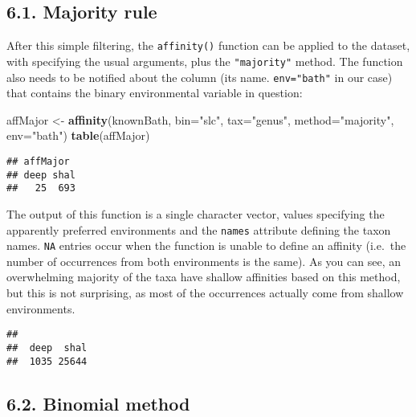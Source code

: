 \documentclass[]{article}
\newenvironment{Shaded}{\begin{snugshade}}{\end{snugshade}}
\newcommand{\KeywordTok}[1]{\textcolor[rgb]{0.13,0.29,0.53}{\textbf{{#1}}}}
\newcommand{\DataTypeTok}[1]{\textcolor[rgb]{0.13,0.29,0.53}{{#1}}}
\newcommand{\StringTok}[1]{\textcolor[rgb]{0.31,0.60,0.02}{{#1}}}
\newcommand{\NormalTok}[1]{{#1}}
\begin{document}
\subsection{6.1. Majority rule}\label{majority-rule}

After this simple filtering, the \texttt{affinity()} function can be
applied to the dataset, with specifying the usual arguments, plus the
\texttt{"majority"} method. The function also needs to be notified about
the column (its name. \texttt{env="bath"} in our case) that contains the
binary environmental variable in question:

\begin{Shaded}
\begin{Highlighting}[]
\NormalTok{affMajor <-}\StringTok{ }\KeywordTok{affinity}\NormalTok{(knownBath, }\DataTypeTok{bin=}\StringTok{"slc"}\NormalTok{, }\DataTypeTok{tax=}\StringTok{"genus"}\NormalTok{, }
  \DataTypeTok{method=}\StringTok{"majority"}\NormalTok{, }\DataTypeTok{env=}\StringTok{"bath"}\NormalTok{)}
\KeywordTok{table}\NormalTok{(affMajor)}
\end{Highlighting}
\end{Shaded}

\begin{verbatim}
## affMajor
## deep shal 
##   25  693
\end{verbatim}

The output of this function is a single character vector, values
specifying the apparently preferred environments and the \texttt{names}
attribute defining the taxon names. \texttt{NA} entries occur when the
function is unable to define an affinity (i.e.~the number of occurrences
from both environments is the same). As you can see, an overwhelming
majority of the taxa have shallow affinities based on this method, but
this is not surprising, as most of the occurrences actually come from
shallow environments.

\begin{Shaded}
\end{Shaded}

\begin{verbatim}
## 
##  deep  shal 
##  1035 25644
\end{verbatim}

\subsection{6.2. Binomial method}\label{binomial-method}
\end{document}
